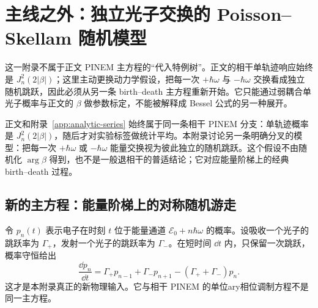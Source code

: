 \chapter{主线之外：独立光子交换的 Poisson--Skellam 随机模型}
\label{app:incoherent-event-chapter}

这一附录不属于正文 PINEM 主方程的“代入特例树”。正文的相干单轨迹响应始终是 $J_n^2(2|\beta|)$；这里主动更换动力学假设，把每一次 $+\hbar\omega$ 与 $-\hbar\omega$ 交换看成独立随机跳跃，因此必须从另一条 birth--death 主方程重新开始。它只能通过弱耦合单光子概率与正文的 $\beta$ 做参数标定，不能被解释成 Bessel 公式的另一种展开。
\label{app:incoherent-event-model}

正文和附录~\ref{app:analytic-series} 始终属于同一条相干 PINEM 分支：单轨迹概率是 \(J_n^2(2|\beta|)\)，随后才对实验标签做统计平均。本附录讨论另一条明确分叉的模型：把每一次 \(+\hbar\omega\) 或 \(-\hbar\omega\) 能量交换视为彼此独立的随机跳跃。这个假设不由随机化 \(\arg\beta\) 得到，也不是一般退相干的普适结论；它对应能量阶梯上的经典 birth--death 过程。

\section{新的主方程：能量阶梯上的对称随机游走}

令 \(p_n(t)\) 表示电子在时刻 \(t\) 位于能量通道
\(
\mathcal E_0+n\hbar\omega
\)
的概率。设吸收一个光子的跳跃率为 \(\Gamma_+\)，发射一个光子的跳跃率为 \(\Gamma_-\)。在短时间 \(\dd t\) 内，只保留一次跳跃，概率守恒给出
\begin{equation}
\boxed{
\frac{\dd p_n}{\dd t}
=\Gamma_+p_{n-1}
+\Gamma_-p_{n+1}
-(\Gamma_++\Gamma_-)p_n.}
\label{eq:birth-death-master}
\end{equation}
这才是本附录真正的新物理输入。它与相干 PINEM 的单位ary相位调制方程不是同一主方程。

